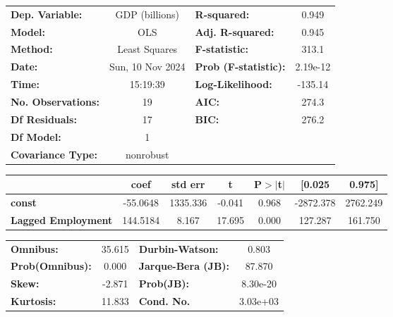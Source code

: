 \documentclass[11pt]{article}
\begin{document}
    \begin{center}
\begin{tabular}{lclc}
\toprule
\textbf{Dep. Variable:}    &  GDP (billions)  & \textbf{  R-squared:         } &     0.949   \\
\textbf{Model:}            &       OLS        & \textbf{  Adj. R-squared:    } &     0.945   \\
\textbf{Method:}           &  Least Squares   & \textbf{  F-statistic:       } &     313.1   \\
\textbf{Date:}             & Sun, 10 Nov 2024 & \textbf{  Prob (F-statistic):} &  2.19e-12   \\
\textbf{Time:}             &     15:19:39     & \textbf{  Log-Likelihood:    } &   -135.14   \\
\textbf{No. Observations:} &          19      & \textbf{  AIC:               } &     274.3   \\
\textbf{Df Residuals:}     &          17      & \textbf{  BIC:               } &     276.2   \\
\textbf{Df Model:}         &           1      & \textbf{                     } &             \\
\textbf{Covariance Type:}  &    nonrobust     & \textbf{                     } &             \\
\bottomrule
\end{tabular}
\begin{tabular}{lcccccc}
                           & \textbf{coef} & \textbf{std err} & \textbf{t} & \textbf{P$> |$t$|$} & \textbf{[0.025} & \textbf{0.975]}  \\
\midrule
\textbf{const}             &     -55.0648  &     1335.336     &    -0.041  &         0.968        &    -2872.378    &     2762.249     \\
\textbf{Lagged Employment} &     144.5184  &        8.167     &    17.695  &         0.000        &      127.287    &      161.750     \\
\bottomrule
\end{tabular}
\begin{tabular}{lclc}
\textbf{Omnibus:}       & 35.615 & \textbf{  Durbin-Watson:     } &    0.803  \\
\textbf{Prob(Omnibus):} &  0.000 & \textbf{  Jarque-Bera (JB):  } &   87.870  \\
\textbf{Skew:}          & -2.871 & \textbf{  Prob(JB):          } & 8.30e-20  \\
\textbf{Kurtosis:}      & 11.833 & \textbf{  Cond. No.          } & 3.03e+03  \\
\bottomrule
\end{tabular}
\end{center}
\end{document}
